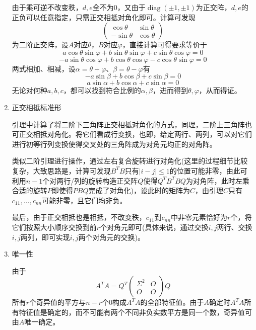 \documentclass[a4paper,UTF8,fontset=windows]{ctexart}
\DeclareMathOperator{\diag}{diag}
\begin{document}
\begin{enumerate}
    由于乘可逆不改变秩，$d,e$全不为0，又由于$\diag(\pm1,\pm1)$为正交阵，$d,e$的正负可以任意指定，只需正交相抵对角化即可。计算可发现
    $$\begin{pmatrix}\cos\theta&\sin\theta\\-\sin\theta&\cos\theta\end{pmatrix}$$
    为二阶正交阵，设$A$对应$\theta$，$B$对应$\varphi$，直接计算可得要求等价于
    $$a\cos\theta\sin\varphi+b\sin\theta\sin\varphi+c\sin\theta\cos\varphi=0$$
    $$-a\sin\theta\cos\varphi+b\cos\theta\cos\varphi-c\cos\theta\sin\varphi=0$$
    两式相加、相减，设$\alpha=\theta+\varphi$、$\beta=\theta-\varphi$有
    $$-a\sin\beta+b\cos\beta+c\sin\beta=0$$
    $$a\sin\alpha+b\cos\alpha+c\sin\alpha=0$$
    无论对何种$a,b,c$，都可以找到符合比例的$\alpha,\beta$，进而得到$\theta,\varphi$，从而得证。

    \item 正交相抵标准形
    
    引理中计算了将二阶下三角阵正交相抵对角化的方式，同理，二阶上三角阵也可正交相抵对角化。将它们看成行变换，也即，给定两行、两列，可以对它们进行初等行列变换使得交叉处的三角阵成为对角元均正的对角阵。

    类似二阶引理进行操作，通过左右复合旋转进行对角化(这里的过程细节比较复杂，大致思路是，计算可发现$B^TB$只有$|i-j|\le1$的位置可能非零，由此可利用$n-1$个对两行/列的旋转构造正交阵$Q$使得$Q^TB^TBQ$为对角阵，此时左乘合适的旋转$P$即使得$PBQ$完成了对角化)，设此时的矩阵为$C$，由引理$C$只有$c_{11},\dots,c_{nn}$可能非零，且它们均非负。

    最后，由于正交相抵也是相抵，不改变秩，$c_{11}$到$c_{nn}$中非零元素恰好为$r$个，将它们按照大小顺序交换到前$r$个对角元即可(具体来说，通过交换$i,j$两行、交换$i,j$两列，即可实现$i,j$两个对角元的交换)。

    \item 唯一性

    由于
    $$A^TA=Q^T\begin{pmatrix}\Sigma^2&O\\O&O\end{pmatrix}Q$$
    所有$r$个奇异值的平方与$n-r$个0构成$A^TA$的全部特征值。由于$A$确定时$A^TA$所有特征值是确定的，而不可能有两个不同非负实数平方是同一个数，奇异值可由$A$唯一确定。
\end{enumerate}
\end{document}
